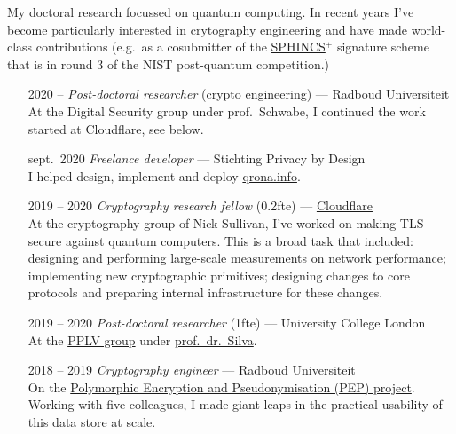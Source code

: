 \documentclass[a4page]{article}
\newcommand\partitle[1]{\vskip20pt\par\noindent{\textsf{\textbf{#1}}}}
\begin{document}
My doctoral research focussed on quantum computing.
In recent years I've become particularly interested
    in crytography engineering and have made world-class contributions
        (e.g.~as a cosubmitter of the
	\href{https://sphincs.org/data/sphincs+-round3-specification.pdf}{SPHINCS$^+$}
    signature scheme that is in round 3 of the NIST post-quantum competition.)

\partitle{Career}
\begin{itemize}
    \item[2020 --] \emph{Post-doctoral researcher} (crypto engineering) --- Radboud Universiteit\\
        At the Digital Security group under prof.~Schwabe,
            I continued the work started at Cloudflare, see below.
    \item[sept.~2020] \emph{Freelance developer} --- Stichting Privacy by Design\\
        I helped design, implement and deploy \href{https://qrona.info}{qrona.info}.
    \item[2019 -- 2020] \emph{Cryptography research fellow} (0.2fte) --- 
        \href{https://cloudflare.com}{Cloudflare} \\
        At the cryptography group of Nick Sullivan, I've
            worked on making TLS secure against quantum computers.
        This is a broad task that included:
                designing and performing large-scale measurements on network
                    performance;
                implementing new cryptographic primitives;
                designing changes to core protocols and
                    preparing internal infrastructure for these changes.
    \item[2019 -- 2020] \emph{Post-doctoral researcher} (1fte) --- University
        College London\\
        At the \href{http://pplv.cs.ucl.ac.uk/welcome/}{PPLV group}
            under \href{https://alexandrasilva.org/#/main.html}{prof.~dr.~Silva}.
    \item[2018 -- 2019] \emph{Cryptography engineer} --- Radboud Universiteit\\
        On the \href{https://pep.cs.ru.nl}{Polymorphic Encryption and Pseudonymisation (PEP) project}.
        Working with five colleagues, I made giant leaps in the practical usability
        of this data store at scale.


\end{itemize}
\end{document}
